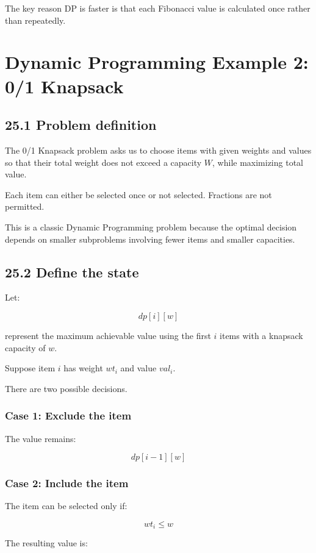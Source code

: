 The key reason DP is faster is that each Fibonacci value is calculated once rather than repeatedly.

\section{Dynamic Programming Example 2: 0/1 Knapsack}

\subsection{25.1 Problem definition}

The 0/1 Knapsack problem asks us to choose items with given weights and values so that their total weight does not exceed a capacity $W$, while maximizing total value.

Each item can either be selected once or not selected. Fractions are not permitted.

This is a classic Dynamic Programming problem because the optimal decision depends on smaller subproblems involving fewer items and smaller capacities.

\subsection{25.2 Define the state}

Let:


\[
\boxed{dp[i][w]}
\]


represent the maximum achievable value using the first $i$ items with a knapsack capacity of $w$.

Suppose item $i$ has weight $wt_i$ and value $val_i$.

There are two possible decisions.

\subsubsection{Case 1: Exclude the item}

The value remains:


\[
dp[i-1][w]
\]


\subsubsection{Case 2: Include the item}

The item can be selected only if:


\[
wt_i\leq w
\]


The resulting value is:


